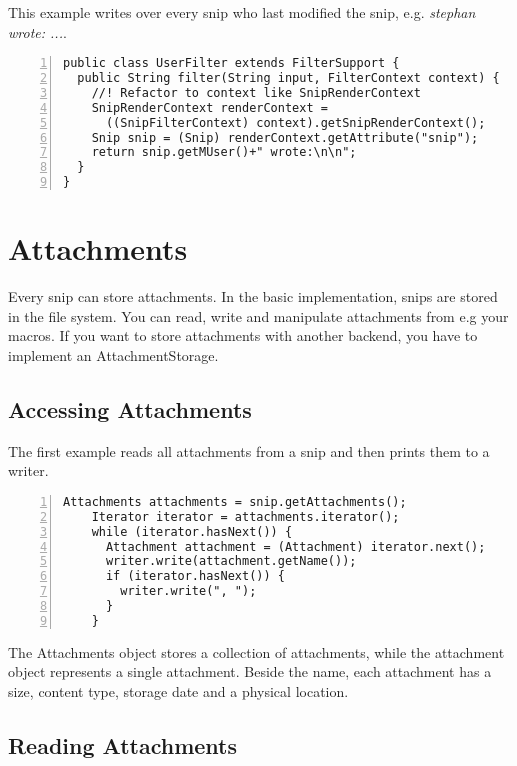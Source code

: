 \documentclass[a4paper,pdftex]{article}
\begin{document}
This example writes over every snip who last modified the snip,
 e.g. \textit{stephan wrote: ...}.

\begin{Verbatim}[gobble=0,frame=single,numbers=left,fontsize=\small]
public class UserFilter extends FilterSupport {
  public String filter(String input, FilterContext context) {
    //! Refactor to context like SnipRenderContext
    SnipRenderContext renderContext =
      ((SnipFilterContext) context).getSnipRenderContext();
    Snip snip = (Snip) renderContext.getAttribute("snip");
    return snip.getMUser()+" wrote:\n\n";
  }
}
\end{Verbatim}

\section{Attachments}

Every snip can store attachments. In the basic implementation, snips are stored
in the file system. You can read, write and manipulate attachments from
e.g your macros. If you want to store attachments with another backend,
you have to implement an AttachmentStorage.

\subsection{Accessing Attachments}

The first example reads all attachments from a snip and then prints them
to a writer.

\begin{Verbatim}[gobble=4,frame=single,numbers=left,fontsize=\small]
    Attachments attachments = snip.getAttachments();
    Iterator iterator = attachments.iterator();
    while (iterator.hasNext()) {
      Attachment attachment = (Attachment) iterator.next();
      writer.write(attachment.getName());
      if (iterator.hasNext()) {
        writer.write(", ");
      }
    }
\end{Verbatim}

The Attachments object stores a collection of attachments, while the attachment object 
represents a single attachment. Beside the name, each attachment has a size, content type, 
storage date and a physical location.

\subsection{Reading Attachments}
\end{document}
